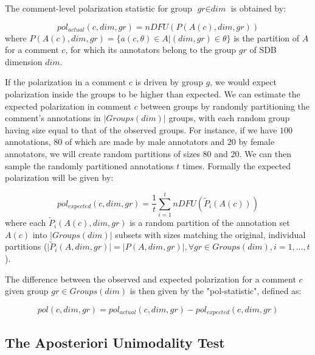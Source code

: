 \documentclass{article}
\newcommand{\sdbdim}{\textit{dim}}
\newcommand{\sdbgroup}{\textit{gr}}
\newcommand{\Sdbgroup}{\textit{Groups}}
\begin{document}
 The comment-level polarization statistic for group $\sdbgroup \in \sdbdim$ is obtained by:
 
 \begin{equation}
 	pol_{actual}(c, \sdbdim, \sdbgroup) = nDFU(P(A(c), \sdbdim, \sdbgroup))
 \end{equation}
 \noindent where $P(A(c),\sdbdim, \sdbgroup) = \{a(c, \theta) \in A | (\sdbdim, \sdbgroup) \in \theta\}$ is the partition of $A$ for a comment $c$, for which its annotators belong  to the group $\sdbgroup$ of \ac{SDB} dimension $\sdbdim$.
 
 If the polarization in a comment $c$ is driven by group $g$, we would expect polarization inside the groups to be higher than expected. We can estimate the expected polarization in comment $c$ between groups by randomly partitioning the comment's annotations in $\lvert \Sdbgroup(\sdbdim) \rvert$ groups, with each random group having size equal to that of the observed groups. For instance, if we have $100$ annotations, $80$ of which are made by male annotators and $20$ by female annotators, we will create random partitions of sizes $80$ and $20$. We can then sample the randomly partitioned annotations $t$ times. Formally the expected polarization will be given by:
 
 \begin{equation}
 	\label{eq:pol_expected}
 	pol_{expected}(c, \sdbdim, \sdbgroup) = \frac{1}{t} \sum_{i=1}^t  nDFU(\tilde{P}_i(A(c)))
 \end{equation}
 \noindent where each $\tilde{P}_i(A(c), \sdbdim, \sdbgroup)$ is a random partition of the annotation set $A(c)$ into $\lvert \Sdbgroup(\sdbdim) \rvert$ subsets with sizes matching the original, individual partitions ($\lvert \tilde{P}_i(A, \sdbdim, \sdbgroup) \rvert = \lvert P(A, \sdbdim, \sdbgroup) \rvert, \forall \sdbgroup \in \Sdbgroup(\sdbdim) , i=1, \ldots, t$).
 
 The difference between the observed and expected polarization for a comment $c$ given group $\sdbgroup \in \Sdbgroup(\sdbdim)$ is then given by the "pol-statistic", defined as: 
 
 \begin{equation}
	\textit{pol}(c, \sdbdim, \sdbgroup)  = pol_{actual}(c, \sdbdim, \sdbgroup) - pol_{expected}(c, \sdbdim, \sdbgroup)
\end{equation}



\subsection{The Aposteriori Unimodality Test}
\label{ssec:methodology:aposteriori}
\end{document}
